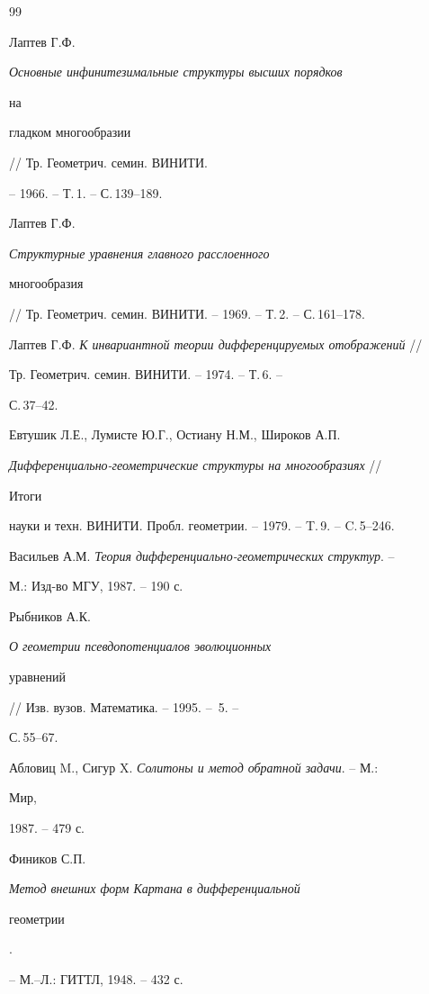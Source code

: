 \begin{thebibliography}{99}


Лаптев Г.Ф. {\em Основные инфинитезимальные структуры высших порядков 


на 


гладком многообразии} // Тр. Геометрич. семин. ВИНИТИ.


-- 1966. -- Т.\,1. -- С.\,139--189. 




Лаптев Г.Ф. {\em Структурные уравнения главного расслоенного 


многообразия} 


// Тр. Геометрич. семин. ВИНИТИ. -- 1969. -- Т.\,2. -- С.\,161--178. 




Лаптев Г.Ф. {\em К инвариантной теории дифференцируемых отображений} // 


Тр. Геометрич. семин. ВИНИТИ. -- 1974. -- Т.\,6. -- 


С.\,37--42. 




Евтушик Л.Е., Лумисте Ю.Г., Остиану Н.М., Широков А.П. 


{\em Дифференциально-гео\-мет\-ри\-чес\-кие структуры на многообразиях} // 


Итоги 


науки и техн. ВИНИТИ. Пробл. геометрии. -- 1979. -- T.\,9. -- C.\,5--246. 




Васильев А.М. {\em Теория дифференциально-геометрических структур}. -- 


М.: Изд-во МГУ, 1987. -- 190 с. 




Рыбников А.К. {\em О геометрии псевдопотенциалов эволюционных 


уравнений} // Изв. вузов. Математика. -- 1995. -- \No\,5. -- 


С.\,55--67. 










Абловиц M., Сигур X. {\em Солитоны и метод обратной задачи}. -- М.: 


Мир, 


1987. -- 479 с. 




Фиников С.П. {\em Метод внешних форм Картана в дифференциальной 


геометрии}. 


-- М.--Л.: ГИТТЛ, 1948. -- 432 с. 


 


\end{thebibliography} 


 


\vskip 2cm 


 






 


\label{end} 


 


